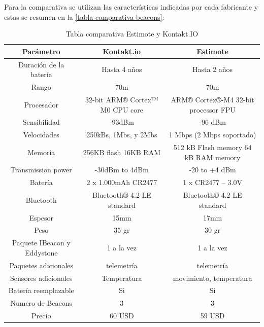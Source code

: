 Para la comparativa se utilizan las características indicadas por cada fabricante y estas se resumen en la \autoref{tabla-comparativa-beacons}:

\begin{table}[ht!]
\centering
\caption{Tabla comparativa Estimote y Kontakt.IO}
\label{tabla-comparativa-beacons}
\begin{tabular}{|c|c|c|}
Parámetro                   & Kontakt.io                      & Estimote                             \\ \hline
Duración de la batería      & Hasta 4 años                    & Hasta 2 años                         \\ \hline
Rango                       & 70m                             & 70m                                  \\ \hline
Procesador                  & 32-bit ARM® Cortex™ M0 CPU core & ARM® Cortex®-M4 32-bit processor FPU \\ \hline
Sensibilidad                & -93dBm                          & -96 dBm                              \\ \hline
Velocidades                 & 250kBs, 1Mbs, y 2Mbs            & 1 Mbps (2 Mbps soportado)            \\ \hline
Memoria                     & 256KB flash 16KB RAM            & 512 kB Flash memory 64 kB RAM memory \\ \hline
Transmission power          & -30dBm to 4dBm                  & -20 to +4 dBm                        \\ \hline
Batería                     & 2 x 1.000mAh CR2477             & 1 x CR2477 – 3.0V                    \\ \hline
Bluetooth                   & Bluetooth® 4.2 LE standard      & Bluetooth® 4.2 LE standard           \\ \hline
Espesor                     & 15mm                            & 17mm                                 \\ \hline
Peso                        & 35 gr                           & 30 gr                                \\ \hline
Paquete IBeacon y Eddystone & 1 a la vez                      & 1 a la vez                           \\ \hline
Paquetes adicionales        & telemetría                      & telemetría                           \\ \hline
Sensores adicionales        & Temperatura                     & movimiento, temperatura              \\ \hline
Batería reemplazable        & Si                              & Si                                   \\ \hline
Numero de Beacons           & 3                               & 3                                    \\ \hline
Precio                      & 60 USD                          & 59 USD                               \\ \hline
\end{tabular}
\end{table}

